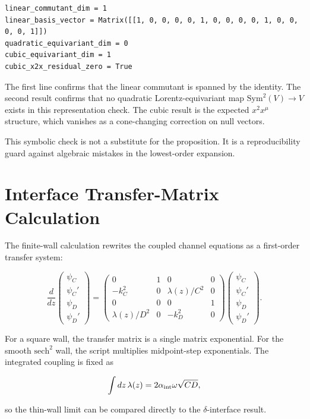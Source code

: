 \documentclass[11pt]{article}
\begin{document}
\begin{verbatim}
linear_commutant_dim = 1
linear_basis_vector = Matrix([[1, 0, 0, 0, 0, 1, 0, 0, 0, 0, 1, 0, 0, 0, 0, 1]])
quadratic_equivariant_dim = 0
cubic_equivariant_dim = 1
cubic_x2x_residual_zero = True
\end{verbatim}

The first line confirms that the linear commutant is spanned by the identity. The second result confirms that no quadratic Lorentz-equivariant map \(\mathrm{Sym}^2(V)\to V\) exists in this representation check. The cubic result is the expected \(x^2x^\mu\) structure, which vanishes as a cone-changing correction on null vectors.


This symbolic check is not a substitute for the proposition. It is a reproducibility guard against algebraic mistakes in the lowest-order expansion.


\section{Interface Transfer-Matrix Calculation}


The finite-wall calculation rewrites the coupled channel equations as a first-order transfer system:


\[
\frac{d}{dz}
\begin{pmatrix}
\psi_C\\
\psi_C'\\
\psi_D\\
\psi_D'
\end{pmatrix}
=
\begin{pmatrix}
0&1&0&0\\
-k_C^2&0&\lambda(z)/C^2&0\\
0&0&0&1\\
\lambda(z)/D^2&0&-k_D^2&0
\end{pmatrix}
\begin{pmatrix}
\psi_C\\
\psi_C'\\
\psi_D\\
\psi_D'
\end{pmatrix}.
\]


For a square wall, the transfer matrix is a single matrix exponential. For the smooth \(\mathrm{sech}^2\) wall, the script multiplies midpoint-step exponentials. The integrated coupling is fixed as


\[
\int dz\,\lambda(z)=2\alpha_{\rm int}\omega\sqrt{CD},
\]


so the thin-wall limit can be compared directly to the \(\delta\)-interface result.
\end{document}
